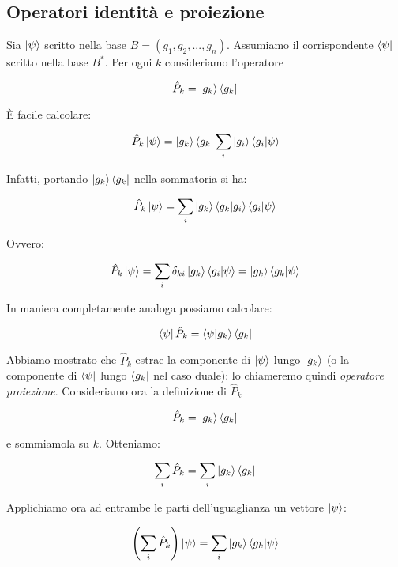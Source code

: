 \subsection{Operatori identità e proiezione}

Sia $\ket{\psi}$ scritto nella base $B = (g_1, g_2, ..., g_n)$. Assumiamo il corrispondente $\bra{\psi}$ scritto nella base $B^*$. Per ogni $k$ consideriamo l'operatore

	\[
		\hat{P}_k = \ket{g_k} \bra{g_k}
	\]

È facile calcolare:

	\begin{equation}
		\hat{P}_k \ket{\psi} = \ket{g_k} \bra{g_k} \sum_i \ket{g_i} \braket{g_i}{\psi}
	\end{equation}

Infatti, portando $\ket{g_k} \bra{g_k}$ nella sommatoria si ha:

	\begin{equation}
		\hat{P}_k \ket{\psi} = \sum_i \ket{g_k} \braket{g_k}{g_i} \braket{g_i}{\psi}
	\end{equation}

Ovvero:

	\begin{equation}
		\hat{P}_k \ket{\psi} = \sum_i \delta_{ki} \ket{g_k} \braket{g_i}{\psi} =  \ket{g_k} \braket{g_k}{\psi}
	\end{equation}

In maniera completamente analoga possiamo calcolare:

	\begin{equation}
		\bra{\psi} \hat{P}_k = \braket{\psi}{g_k} \bra{g_k}
	\end{equation}

Abbiamo mostrato che $\hat{P}_k$ estrae la componente di $\ket{\psi}$ lungo $\ket{g_k}$ (o la componente di $\bra{\psi}$ lungo $\bra{g_k}$ nel caso duale): lo chiameremo quindi \textit{operatore proiezione}.
Consideriamo ora la definizione di $\hat{P}_k$

	\[
		\hat{P}_k = \ket{g_k} \bra{g_k}
	\]

e sommiamola su $k$. Otteniamo:

	\begin{equation}
		\sum_i \hat{P}_k = \sum_i \ket{g_k} \bra{g_k}
	\end{equation}

Applichiamo ora ad entrambe le parti dell'uguaglianza un vettore $\ket{\psi}$:

	\begin{equation} \label{eq:identityDeriv1}
		\left ( \sum_i \hat{P}_k \right ) \ket{\psi} = \sum_i \ket{g_k} \braket{g_k}{\psi}
	\end{equation}


